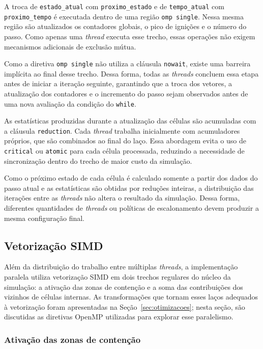 \documentclass[11pt,a4paper]{article}
\begin{document}
A troca de \texttt{estado\_atual} com \texttt{proximo\_estado} e de \texttt{tempo\_atual} com \texttt{proximo\_tempo} é executada dentro de uma região \texttt{omp single}. Nessa mesma região são atualizados os contadores globais, o pico de ignições e o número do passo. Como apenas uma \emph{thread} executa esse trecho, essas operações não exigem mecanismos adicionais de exclusão mútua.

Como a diretiva \texttt{omp single} não utiliza a cláusula \texttt{nowait}, existe uma barreira implícita ao final desse trecho. Dessa forma, todas as \emph{threads} concluem essa etapa antes de iniciar a iteração seguinte, garantindo que a troca dos vetores, a atualização dos contadores e o incremento do passo sejam observados antes de uma nova avaliação da condição do \texttt{while}.

As estatísticas produzidas durante a atualização das células são acumuladas com a cláusula \texttt{reduction}. Cada \emph{thread} trabalha inicialmente com acumuladores próprios, que são combinados ao final do laço. Essa abordagem evita o uso de \texttt{critical} ou \texttt{atomic} para cada célula processada, reduzindo a necessidade de sincronização dentro do trecho de maior custo da simulação.

Como o próximo estado de cada célula é calculado somente a partir dos dados do passo atual e as estatísticas são obtidas por reduções inteiras, a distribuição das iterações entre as \emph{threads} não altera o resultado da simulação. Dessa forma, diferentes quantidades de \emph{threads} ou políticas de escalonamento devem produzir a mesma configuração final.
\subsection{Vetorização SIMD}
\label{sec:simd}

Além da distribuição do trabalho entre múltiplas \emph{threads}, a implementação paralela utiliza vetorização SIMD em dois trechos regulares do núcleo da simulação: a ativação das zonas de contenção e a soma das contribuições dos vizinhos de células internas. As transformações que tornam esses laços adequados à vetorização foram apresentadas na Seção~\ref{sec:otimizacoes}; nesta seção, são discutidas as diretivas OpenMP utilizadas para explorar esse paralelismo.

\subsubsection{Ativação das zonas de contenção}
\end{document}
